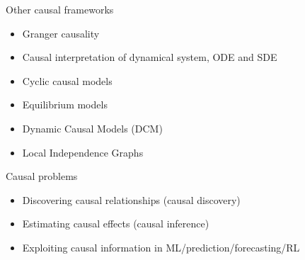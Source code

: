 \documentclass{beamer}
\begin{document}
\begin{frame}{Other causal frameworks}
	\begin{itemize}
		\item<1-> Granger causality
		\item<2-> Causal interpretation of dynamical system, ODE and SDE \citep{mooij2013ordinary, peters2022causal, hansen2014causal} 
		\item<3-> Cyclic causal models~\citep{hyttinen2012learning, bongers2016theoretical}    
		\item<4-> Equilibrium models~\citep{young2019identifying, varando2020graphical}
		\item<5-> Dynamic Causal Models (DCM)~\citep{friston2003dynamic}
		\item<6-> Local Independence Graphs~\citep{didelez2006asymmetric, mogensen2020markov}  
	\end{itemize}
\end{frame}


\begin{frame}{Causal problems}
\begin{itemize}
	\item<1-> Discovering causal relationships  (causal discovery) 
	\item<2-> Estimating causal effects (causal inference) 
	\item<3->  Exploiting causal information in ML/prediction/forecasting/RL 
\end{itemize}
\end{frame}
\end{document}
